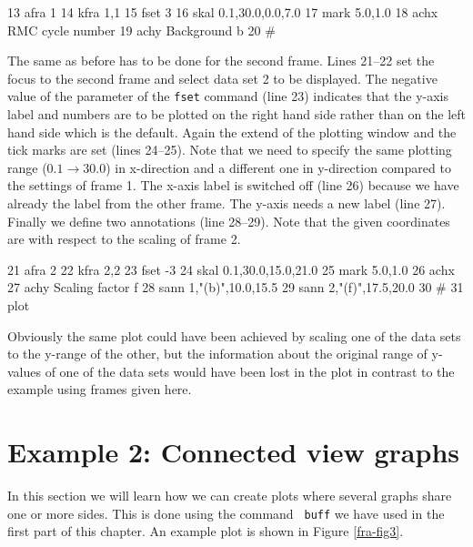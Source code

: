 \begin{MacVerbatim}
    13  afra 1
    14  kfra 1,1
    15  fset 3
    16  skal 0.1,30.0,0.0,7.0
    17  mark 5.0,1.0
    18  achx RMC cycle number
    19  achy Background b
    20  #
\end{MacVerbatim}

The same as before has to be done for the second frame.  Lines
21--22 set the focus to the second frame and select data set 2 to be
displayed.  The negative value of the parameter of the {\tt fset}
command (line 23) indicates that the y-axis label and numbers are to
be plotted on the right hand side rather than on the left hand side
which is the default.  Again the extend of the plotting window and
the tick marks are set (lines 24--25).  Note that we need to specify
the same plotting range ($0.1 \rightarrow 30.0$) in x-direction and
a different one in y-direction compared to the settings of frame 1.
The x-axis label is switched off (line 26) because we have already
the label from the other frame.  The y-axis needs a new label (line
27).  Finally we define two annotations (line 28--29).  Note that
the given coordinates are with respect to the scaling of frame 2.

\begin{MacVerbatim}
    21  afra 2
    22  kfra 2,2
    23  fset -3
    24  skal 0.1,30.0,15.0,21.0
    25  mark 5.0,1.0
    26  achx
    27  achy Scaling factor f
    28  sann 1,"(b)",10.0,15.5
    29  sann 2,"(f)",17.5,20.0
    30  #
    31  plot
\end{MacVerbatim}

Obviously the same plot could have been achieved by scaling one of
the data sets to the y-range of the other, but the information about
the original range of y-values of one of the data sets would have
been lost in the plot in contrast to the example using frames given
here.


\section{Example 2: Connected view graphs \label{frame-exa2}}

In this section we will learn how we can create plots where several
graphs share one or more sides. This is done using the command {\tt
buff} we have used in the first part of this chapter. An example
plot is shown in Figure \ref{fra-fig3}.

